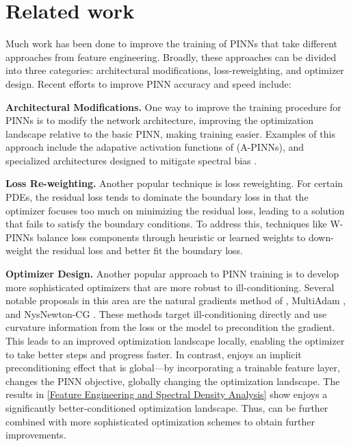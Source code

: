 \section{Related work}
Much work has been done to improve the training of PINNs that take different approaches from feature engineering. 
Broadly, 
these approaches can be divided into three categories: architectural modifications, loss-reweighting, and optimizer design.  
Recent efforts to improve PINN accuracy and speed include:

\textbf{Architectural Modifications.}
One way to improve the training procedure for PINNs is to modify the network architecture, improving the optimization landscape  relative to the basic PINN, making training easier. 
Examples of this approach include the adapative activation functions of \cite{jagtap2020adaptive} (A-PINNs), and specialized architectures designed to mitigate spectral bias \citep{li2020d3m}.
    
\textbf{Loss Re-weighting.}
Another popular technique is loss reweighting.
For certain PDEs, the residual loss tends to dominate the boundary loss in that the optimizer focuses too much on minimizing the residual loss, leading to a solution that fails to satisfy the boundary conditions. 
To address this, techniques like W-PINNs \cite{wang2021understanding} balance loss components through heuristic or learned weights to down-weight the
residual loss and better fit the boundary loss.

\textbf{Optimizer Design.}
Another popular approach to PINN training is to develop more sophisticated optimizers that are more robust to ill-conditioning. 
Several notable proposals in this area are the natural gradients method of \cite{muller2023achieving}, MultiAdam \cite{yao2023multiadam}, and NysNewton-CG \cite{rathore2024challenges}.
These methods target ill-conditioning directly and use curvature information from the loss or the model to precondition the gradient.
This leads to an improved optimization landscape locally, enabling the optimizer to take better steps and progress faster.
In contrast, \sfnet{} enjoys an implicit preconditioning effect that is global---by incorporating a trainable feature layer, \sfnet{} changes the PINN objective, globally changing the optimization landscape.
The results in \cref{Feature Engineering and Spectral Density Analysis} show \sfnet{} enjoys a significantly better-conditioned optimization landscape. 
Thus, \sfnet{} can be further combined with more sophisticated optimization schemes to obtain further improvements.